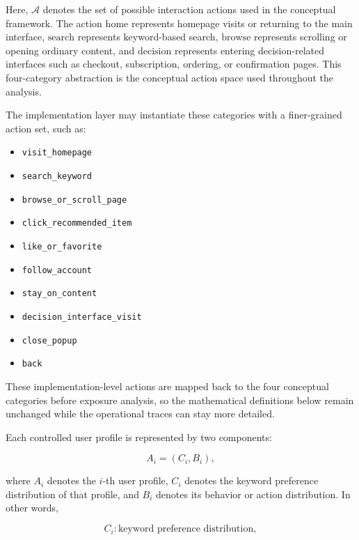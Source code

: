Here, $\mathcal{A}$ denotes the set of possible interaction actions used in the conceptual framework. The action $\mathrm{home}$ represents homepage visits or returning to the main interface, $\mathrm{search}$ represents keyword-based search, $\mathrm{browse}$ represents scrolling or opening ordinary content, and $\mathrm{decision}$ represents entering decision-related interfaces such as checkout, subscription, ordering, or confirmation pages. This four-category abstraction is the conceptual action space used throughout the analysis.

The implementation layer may instantiate these categories with a finer-grained action set, such as:

\begin{itemize}
    \item \texttt{visit\_homepage}
    \item \texttt{search\_keyword}
    \item \texttt{browse\_or\_scroll\_page}
    \item \texttt{click\_recommended\_item}
    \item \texttt{like\_or\_favorite}
    \item \texttt{follow\_account}
    \item \texttt{stay\_on\_content}
    \item \texttt{decision\_interface\_visit}
    \item \texttt{close\_popup}
    \item \texttt{back}
\end{itemize}

These implementation-level actions are mapped back to the four conceptual categories before exposure analysis, so the mathematical definitions below remain unchanged while the operational traces can stay more detailed.

Each controlled user profile is represented by two components:

\begin{equation}
A_i = (C_i, B_i),
\label{eq:profile-definition}
\end{equation}

where $A_i$ denotes the $i$-th user profile, $C_i$ denotes the keyword preference distribution of that profile, and $B_i$ denotes its behavior or action distribution. In other words,

\begin{equation}
C_i : \text{keyword preference distribution},
\label{eq:keyword-distribution-text}
\end{equation}

